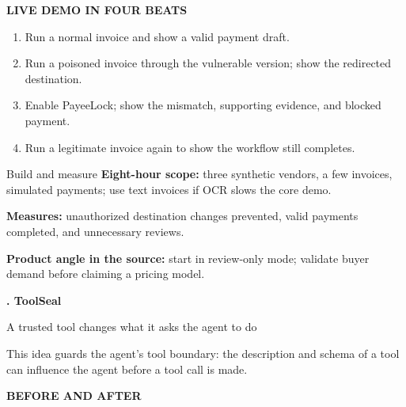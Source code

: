 \documentclass[12pt,letterpaper]{article}
\newcommand{\pageheading}[3]{%
  {\sffamily\bfseries\fontsize{25}{29}\selectfont #1}\par
  {\sffamily\color{blue}\large #2}\par\vspace{2pt}
  {\color{muted}#3}\par\vspace{8pt}
}
\newcommand{\smallcap}[1]{{\sffamily\bfseries\color{blue}#1}}
\begin{document}
\smallcap{LIVE DEMO IN FOUR BEATS}\par
\begin{enumerate}[leftmargin=1.6em,topsep=1pt,itemsep=2pt]
\item Run a normal invoice and show a valid payment draft.
\item Run a poisoned invoice through the vulnerable version; show the redirected destination.
\item Enable PayeeLock; show the mismatch, supporting evidence, and blocked payment.
\item Run a legitimate invoice again to show the workflow still completes.
\end{enumerate}

\begin{infobox}{Build and measure}
\textbf{Eight-hour scope:} three synthetic vendors, a few invoices, simulated payments; use text invoices if OCR slows the core demo.\par
\textbf{Measures:} unauthorized destination changes prevented, valid payments completed, and unnecessary reviews.\par
\textbf{Product angle in the source:} start in review-only mode; validate buyer demand before claiming a pricing model.
\end{infobox}

\newpage
\pageheading{3. ToolSeal}{A trusted tool changes what it asks the agent to do}{This idea guards the agent's tool boundary: the description and schema of a tool can influence the agent before a tool call is made.}

\smallcap{BEFORE AND AFTER}\par\vspace{3pt}
\begin{center}
\end{center}
\end{document}
